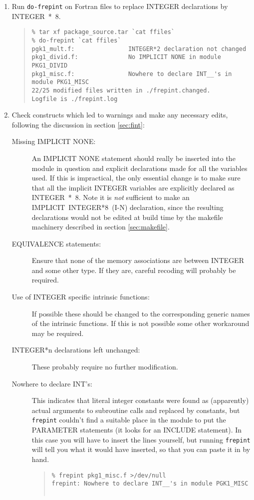 \documentclass[twoside,11pt]{article}
\newcommand{\htmlref}[2]{#1}
\newcommand{\html}[1]{}
\renewcommand{\_}{\texttt{\symbol{95}}}
\newcommand{\xroutine}[1]{\htmlref{{\tt #1}}{#1}}
\newcommand{\xdofilter}[1]{\htmlref{{\tt do-#1}}{do-xxx}}
\newcommand{\routine}[1]{{\tt #1}}
\newenvironment{squote}{\begin{quote}\begin{small}}{\end{small}\end{quote}}
\begin{document}
\begin{enumerate}
\html{\begin{squote}\end{squote}}
\item
Run \xdofilter{frepint} on Fortran files to replace INTEGER declarations
by INTEGER~*~8.
\begin{squote}
\begin{verbatim}
% tar xf package_source.tar `cat ffiles`
% do-frepint `cat ffiles`
pgk1_mult.f:               INTEGER*2 declaration not changed                 
pkg1_divid.f:              No IMPLICIT NONE in module PKG1_DIVID
pkg1_misc.f:               Nowhere to declare INT__'s in module PKG1_MISC
22/25 modified files written in ./frepint.changed.
Logfile is ./frepint.log
\end{verbatim}
\end{squote}
%
\item
Check constructs which led to warnings and make any necessary edits,
following the discussion in section \ref{sec:fint}:
\begin{description}
%
\item[Missing IMPLICIT NONE:]
An IMPLICIT NONE statement should really 
be inserted into the module in question and 
explicit declarations made for all the variables used.
If this is impractical, the only essential change is to make sure that
all the implicit INTEGER variables are explicitly declared as INTEGER~*~8.
Note it is {\it not\/} sufficient to make an IMPLICIT~INTEGER*8~(I-N)
declaration, since the resulting declarations would not be edited 
at build time by
the makefile machinery described in section \ref{sec:makefile}.
%
\item[EQUIVALENCE statements:]
Ensure that none of the memory associations are between INTEGER and some
other type.  If they are, careful recoding will probably be required.
%
\item[Use of INTEGER specific intrinsic functions:]
If possible these should be changed to the corresponding generic 
names of the intrinsic functions.
If this is not possible some other workaround may be required.
%
\item[INTEGER*n declarations left unchanged:]
These probably require no further modification.
%
\item[Nowhere to declare INT\_\_'s:]
This indicates that literal integer constants were found as (apparently)
actual arguments to subroutine calls and replaced by constants,
but \xroutine{frepint} couldn't find a suitable place in
the module to put the PARAMETER statements (it looks for an INCLUDE 
statement).  In this case you will have to insert the lines yourself,
but running \routine{frepint} will tell you what it would have inserted,
so that you can paste it in by hand.
\begin{squote}
\begin{verbatim}
% frepint pkg1_misc.f >/dev/null
frepint: Nowhere to declare INT__'s in module PGK1_MISC


\end{verbatim}
\end{squote}
\end{description}
\end{enumerate}
\end{document}
